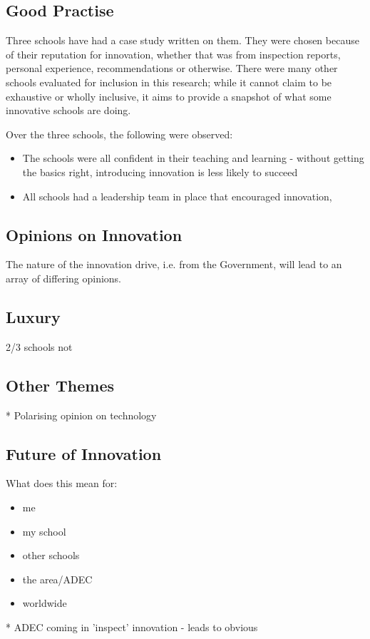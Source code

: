 \subsection{Good Practise}
Three schools have had a case study written on them. They were chosen because of their reputation for innovation, whether that was from inspection reports, personal experience, recommendations or otherwise. There were many other schools evaluated for inclusion in this research; while it cannot claim to be exhaustive or wholly inclusive, it aims to provide a snapshot of what some innovative schools are doing. 

Over the three schools, the following were observed:

\begin{itemize}
\item The schools were all confident in their teaching and learning - without getting the basics right, introducing innovation is less likely to succeed
\item All schools had a leadership team in place that encouraged innovation, 
\end{itemize}






\subsection{Opinions on Innovation}

The nature of the innovation drive, i.e. from the Government, will lead to an array of differing opinions.

\subsection{Luxury}
2/3 schools not \cite{ADEC2016 pi.3}

\subsection{Other Themes}
* Polarising opinion on technology

\subsection{Future of Innovation}


What does this mean for:
\begin{itemize}
\item me
\item my school
\item other schools
\item the area/ADEC
\item worldwide
\end{itemize}
* ADEC coming in 'inspect' innovation - leads to obvious
